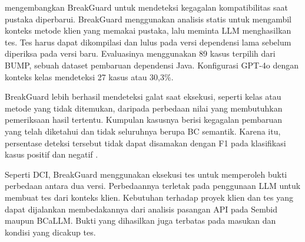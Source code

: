 \textcite{Raj2026BreakGuard} mengembangkan BreakGuard untuk mendeteksi kegagalan kompatibilitas saat pustaka diperbarui. BreakGuard menggunakan analisis statis untuk mengambil konteks metode klien yang memakai pustaka, lalu meminta LLM menghasilkan tes. Tes harus dapat dikompilasi dan lulus pada versi dependensi lama sebelum diperiksa pada versi baru. Evaluasinya menggunakan 89 kasus terpilih dari BUMP, sebuah dataset pembaruan dependensi Java. Konfigurasi GPT-4o dengan konteks kelas mendeteksi 27 kasus atau 30,3\%.

BreakGuard lebih berhasil mendeteksi galat saat eksekusi, seperti kelas atau metode yang tidak ditemukan, daripada perbedaan nilai yang membutuhkan pemeriksaan hasil tertentu. Kumpulan kasusnya berisi kegagalan pembaruan yang telah diketahui dan tidak seluruhnya berupa BC semantik. Karena itu, persentase deteksi tersebut tidak dapat disamakan dengan F1 pada klasifikasi kasus positif dan negatif \parencite{Raj2026BreakGuard}.

Seperti DCI, BreakGuard menggunakan eksekusi tes untuk memperoleh bukti perbedaan antara dua versi. Perbedaannya terletak pada penggunaan LLM untuk membuat tes dari konteks klien. Kebutuhan terhadap proyek klien dan tes yang dapat dijalankan membedakannya dari analisis pasangan API pada Sembid maupun BCaLLM\@. Bukti yang dihasilkan juga terbatas pada masukan dan kondisi yang dicakup tes.
